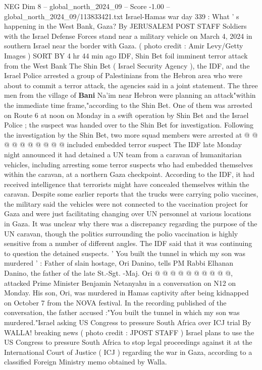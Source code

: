 \begin{textsample}{NEG Dim 8 – global\_north\_2024\_09 – Score -1.00 – global\_north\_2024\_09/113833421.txt}  \label{ex:f8_neg_376}
Israel-Hamas war day 339 : What ' s happening in the West Bank, Gaza?
By JERUSALEM POST STAFF Soldiers with the Israel Defense Forces stand near a military vehicle on March 4, 2024 in southern Israel near the border with Gaza. ( photo credit : Amir Levy/Getty Images ) SORT BY 4 hr 44 min ago IDF, Shin Bet foil imminent terror attack from the West Bank The Shin Bet ( Israel Security Agency ), the IDF, and the Israel Police arrested a group of Palestinians from the Hebron area who were about to commit a terror attack, the agencies said in a joint statement.
The three men from the village of \textbf{Bani} Na'im near Hebron were planning an attack"within the immediate time frame,"according to the Shin Bet.
One of them was arrested on Route 6 at noon on Monday in a swift operation by Shin Bet and the Israel Police ; the suspect was handed over to the Shin Bet for investigation.
Following the investigation by the Shin Bet, two more squad members were arrested at @ @ @ @ @ @ @ @ @ @ included embedded terror suspect The IDF late Monday night announced it had detained a UN team from a caravan of humanitarian vehicles, including arresting some terror suspects who had embedded themselves within the caravan, at a northern Gaza checkpoint.
According to the IDF, it had received intelligence that terrorists might have concealed themselves within the caravan.
Despite some earlier reports that the trucks were carrying polio vaccines, the military said the vehicles were not connected to the vaccination project for Gaza and were just facilitating changing over UN personnel at various locations in Gaza.
It was unclear why there was a discrepancy regarding the purpose of the UN caravan, though the politics surrounding the polio vaccination is highly sensitive from a number of different angles.
The IDF said that it was continuing to question the detained suspects. ' You built the tunnel in which my son was murdered ' : Father of slain hostage, Ori Danino, tells PM Rabbi Elhanan Danino, the father of the late St.-Sgt. -Maj.
Ori @ @ @ @ @ @ @ @ @ @, attacked Prime Minister Benjamin Netanyahu in a conversation on N12 on Monday.
His son, Ori, was murdered in Hamas captivity after being kidnapped on October 7 from the NOVA festival.
In the recording published of the conversation, the father accused :"You built the tunnel in which my son was murdered."Israel asking US Congress to pressure South Africa over ICJ trial By WALLA! breaking news ( photo credit : JPOST STAFF ) Israel plans to use the US Congress to pressure South Africa to stop legal proceedings against it at the International Court of Justice ( ICJ ) regarding the war in Gaza, according to a classified Foreign Ministry memo obtained by Walla.

\end{textsample}
